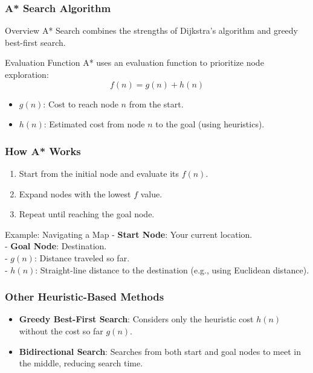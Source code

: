 \documentclass[aspectratio=169]{beamer}
\begin{document}
\begin{frame}[fragile]
  \frametitle{A* Search Algorithm}
  \begin{block}{Overview}
    A* Search combines the strengths of Dijkstra’s algorithm and greedy best-first search.
  \end{block}
  \begin{block}{Evaluation Function}
    A* uses an evaluation function to prioritize node exploration:
    \[
    f(n) = g(n) + h(n)
    \]
    \begin{itemize}
      \item \( g(n) \): Cost to reach node \( n \) from the start.
      \item \( h(n) \): Estimated cost from node \( n \) to the goal (using heuristics).
    \end{itemize}
  \end{block}
\end{frame}

\begin{frame}[fragile]
  \frametitle{How A* Works}
  \begin{enumerate}
    \item Start from the initial node and evaluate its \( f(n) \).
    \item Expand nodes with the lowest \( f \) value.
    \item Repeat until reaching the goal node.
  \end{enumerate}

  \begin{block}{Example: Navigating a Map}
    - \textbf{Start Node}: Your current location.\\
    - \textbf{Goal Node}: Destination.\\
    - \( g(n) \): Distance traveled so far.\\
    - \( h(n) \): Straight-line distance to the destination (e.g., using Euclidean distance).
  \end{block}
\end{frame}

\begin{frame}[fragile]
  \frametitle{Other Heuristic-Based Methods}
  \begin{itemize}
    \item \textbf{Greedy Best-First Search}:
      Considers only the heuristic cost \( h(n) \) without the cost so far \( g(n) \).
      
    \item \textbf{Bidirectional Search}:
      Searches from both start and goal nodes to meet in the middle, reducing search time.
  \end{itemize}
\end{frame}
\end{document}
